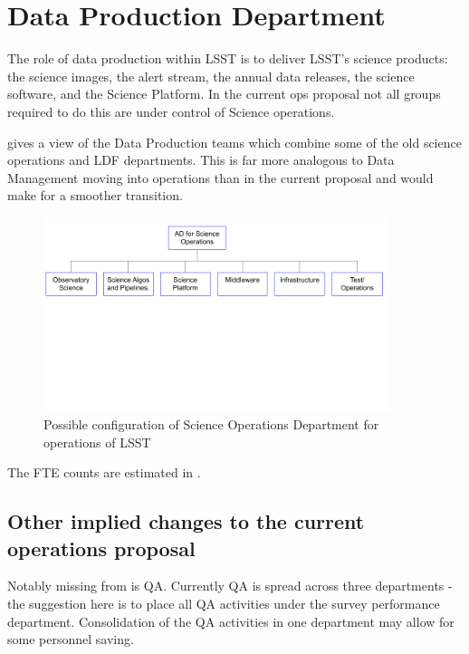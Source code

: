 
\section{Data Production Department }\label{sec:sciops} \label{sec:dataprod}

The role of data production within \gls{LSST} is to deliver \gls{LSST}'s science products: the science images, the alert stream, the annual data releases, the science \gls{software}, and the Science Platform. In the current ops proposal not all groups required to do this are under control of Science operations.

 gives a view of the Data Production teams which combine some of the old science operations  and LDF departments. This is far more analogous to Data Management moving into operations than in the current proposal and would make for a smoother transition.

\begin{figure}
\begin{center}
\includegraphics[width=0.9\textwidth]{figures/SciOpsOrg}
\caption{Possible configuration of Science Operations Department for operations of \gls{LSST} \label{fig:sciopsorg}}
\end{center}
\end{figure}

The FTE counts are estimated in .





\subsection{Other implied changes to the current operations proposal}
Notably missing from  is \gls{QA}. Currently \gls{QA} is spread across  three
 departments - the suggestion here is to place all \gls{QA} activities under the survey performance department. Consolidation
of the \gls{QA} activities in one department may allow for some personnel saving.

